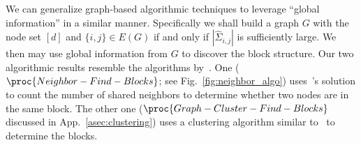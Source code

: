 We can generalize graph-based algorithmic techniques to leverage ``global information'' in a similar manner. Specifically we shall build a graph $G$ with the node set $[d]$ and $\{i, j\} \in E(G)$ if and only if $|\hat \Sigma_{i,j}| $ is sufficiently large. We then may use global information from $G$ to discover the block structure. Our two algorithmic results resemble the algorithms by~\cite{abraham2015low,rohe2011spectral}. 
One ($\proc{Neighbor-Find-Blocks}$; see Fig.~\ref{fig:neighbor_algo}) uses~\cite{abraham2015low}'s solution to count the number of shared neighbors to determine whether two nodes are in the same block. The other one ($\proc{Graph-Cluster-Find-Blocks}$ discussed in App.~\ref{asec:clustering}) uses a clustering algorithm similar to~\cite{rohe2011spectral} to determine the blocks. 





